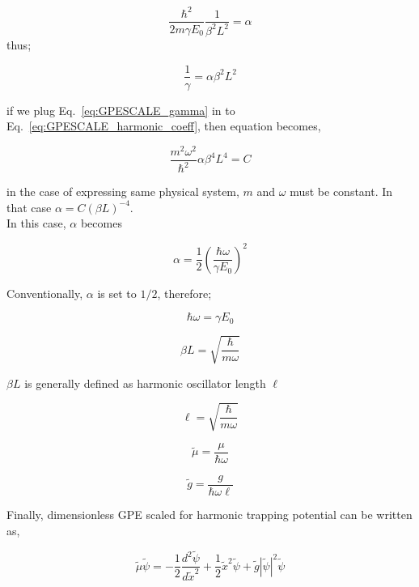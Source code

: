\documentclass[a4paper,times,hidelinks,12pt]{article}
\begin{document}
\begin{equation}
\label{eq:GPESCALE_alpha}
    \frac{\hbar^2}{2m\gamma E_0} \frac{1}{\beta^2 L^2} = \alpha
\end{equation}
thus;

\begin{equation}
\label{eq:GPESCALE_gamma}
     \frac{1}{\gamma} = \alpha \beta^2 L^2
\end{equation}

if we plug Eq.~\eqref{eq:GPESCALE_gamma} in to Eq.~\eqref{eq:GPESCALE_harmonic_coeff}, then equation becomes,

\begin{equation}
\label{eq:GPESCALE_harmonic_coeff_2}
    \frac{m^2\omega^2}{\hbar^2} \alpha \beta^4 L^4 = C 
\end{equation} 

in the case of expressing same physical system, $m$ and $\omega$ must be constant. In that case $\alpha = C (\beta L)^{-4}$.\\


In this case, $\alpha$ becomes

$$ \alpha =  \frac{1}{2} \left(\frac{\hbar \omega}{\gamma E_0}\right)^2 $$

Conventionally, $\alpha$ is set to $1/2$, therefore;

$$ \hbar \omega = \gamma E_0 $$

$$ \beta L = \sqrt{\frac{\hbar}{m\omega}} $$ 

$ \beta L $ is generally defined as harmonic oscillator length $\ell$

$$ \ell = \sqrt{\frac{\hbar}{m\omega}} $$ 

$$ \widetilde{\mu} = \frac{\mu}{\hbar \omega} $$ 

$$ \widetilde{g} = \frac{g}{\hbar \omega \ell} $$

Finally, dimensionless GPE scaled for harmonic trapping potential can be written as,

$$\widetilde{\mu} \widetilde{\psi} = -\frac{1}{2}\frac{d^2\widetilde{\psi}}{d\widetilde{x}^2} + \frac{1}{2}\widetilde{x}^2\widetilde{\psi} + \widetilde{g}|\widetilde{\psi}|^2 \widetilde{\psi} $$
\end{document}
